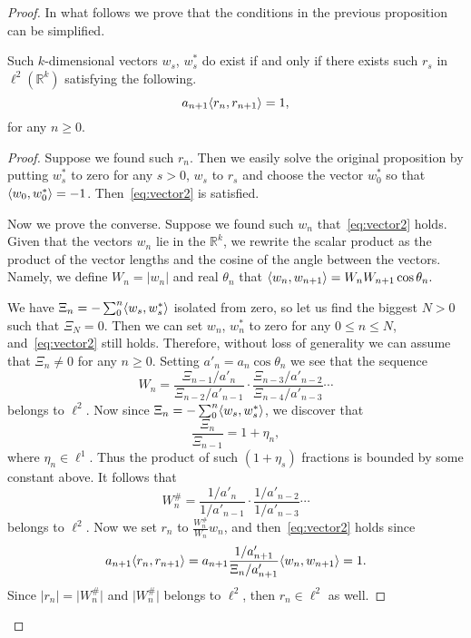 \begin{proof}
    In what follows we prove that the conditions in the previous proposition can be simplified.
    \begin{prop}
      \label{prop:reformulation-lw}
      Such $k$-dimensional vectors $w_s$, $w^*_s$ do exist if and only if there exists such $r_s$ in $\ell^2(\mathbb{R}^k)$
        satisfying the following.
      \begin{equation}
        \label{eq:vector3}
        a_{n+1} \langle r_n, r_{n+1} \rangle = 1,
      \end{equation}
      for any $n \geq 0$.
    \end{prop}
    \begin{proof}
      Suppose we found such $r_n$.
      Then we easily solve the original proposition by putting $w^*_s$ to zero for any $s > 0$, $w_s$ to $r_s$ and
        choose the vector $w^*_0$ so that $\langle w_0, w^*_0 \rangle = -1$.
      Then~\eqref{eq:vector2} is satisfied.

      Now we prove the converse.
      Suppose we found such $w_n$ that~\eqref{eq:vector2} holds.
      Given that the vectors $w_n$ lie in the $\mathbb{R}^k$, we rewrite the scalar product as
        the product of the vector lengths and the cosine of the angle between the vectors.
      Namely, we define $W_n = \lvert w_n\rvert$ and real $\theta_n$ that
        $\langle w_{n}, w_{n+1} \rangle = W_n W_{n+1} \cos{\theta_n}.$

      We have $\Xi_n = -\sum_0^n \langle w_s, w^*_s \rangle$ isolated from zero, so let us
        find the biggest $N > 0$ such that $\Xi_N = 0$.
      Then we can set $w_n$, $w^*_n$ to zero for any $0 \leq n \leq N$, and~\eqref{eq:vector2}
        still holds.
      Therefore, without loss of generality we can assume that $\Xi_n \neq 0$ for any $n \geq 0$.
      Setting $a'_n = a_n \cos{\theta_n}$ we see that the sequence
      \[
        W_n = \frac{\Xi_{n-1}/a'_n}{\Xi_{n-2}/a'_{n-1}} \cdot \frac{\Xi_{n-3}/a'_{n-2}}{\Xi_{n-4}/a'_{n-3}} \cdots
      \]
        belongs to $\ell^2$.
      Now since $\Xi_n = -\sum_0^n \langle w_s, w^*_s \rangle$, we discover that
      \[
        \frac{\Xi_n}{\Xi_{n-1}} = 1 + \eta_n,
      \]
        where $\eta_n \in \ell^1$.
      Thus the product of such $(1 + \eta_s)$ fractions is bounded by some constant above.
      It follows that
      \[
        W^\#_n = \frac{1/a'_n}{1/a'_{n-1}} \cdot \frac{1/a'_{n-2}}{1/a'_{n-3}} \cdots
      \]
        belongs to $\ell^2$.
      Now we set $r_n$ to $\frac{W^\#_n}{W_n}w_n$, and then~\eqref{eq:vector2} holds since
      \[
        a_{n+1} \langle r_n, r_{n+1} \rangle = a_{n+1} \frac{1/a'_{n+1}}{\Xi_n/a'_{n+1}} \langle w_n, w_{n+1} \rangle = 1.
      \]
      Since $\lvert r_n \rvert = \lvert W^\#_n \rvert$ and $\lvert W^\#_n \rvert$ belongs to $\ell^2$,
        then $r_n \in \ell^2$ as well.
    \end{proof}


\end{proof}
